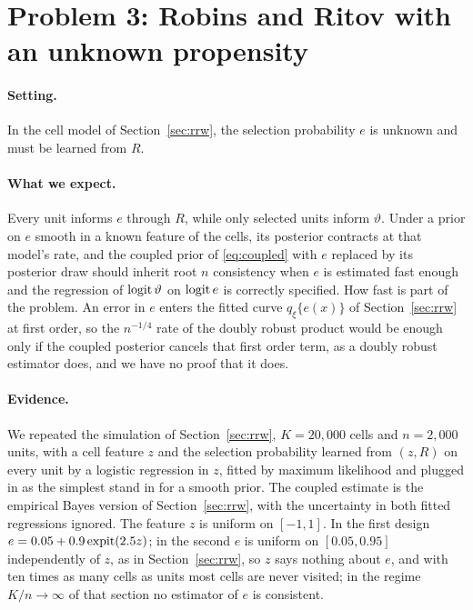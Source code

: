 \section{Problem 3: Robins and Ritov with an unknown propensity}

\paragraph{Setting.} In the cell model of Section~\ref{sec:rrw}, the selection probability $e$ is unknown and must be learned from $R$.

\paragraph{What we expect.} Every unit informs $e$ through $R$, while only selected units inform $\vartheta$. Under a prior on $e$ smooth in a known feature of the cells, its posterior contracts at that model's rate, and the coupled prior of \eqref{eq:coupled} with $e$ replaced by its posterior draw should inherit root $n$ consistency when $e$ is estimated fast enough and the regression of $\operatorname{logit}\vartheta$ on $\operatorname{logit} e$ is correctly specified. How fast is part of the problem. An error in $e$ enters the fitted curve $q_\xi\{e(x)\}$ of Section~\ref{sec:rrw} at first order, so the $n^{-1/4}$ rate of the doubly robust product would be enough only if the coupled posterior cancels that first order term, as a doubly robust estimator does, and we have no proof that it does.

\paragraph{Evidence.} We repeated the simulation of Section~\ref{sec:rrw}, $K = 20{,}000$ cells and $n = 2{,}000$ units, with a cell feature $z$ and the selection probability learned from $(z, R)$ on every unit by a logistic regression in $z$, fitted by maximum likelihood and plugged in as the simplest stand in for a smooth prior. The coupled estimate is the empirical Bayes version of Section~\ref{sec:rrw}, with the uncertainty in both fitted regressions ignored. The feature $z$ is uniform on $[-1, 1]$. In the first design $e = 0.05 + 0.9\operatorname{expit}(2.5z)$; in the second $e$ is uniform on $[0.05, 0.95]$ independently of $z$, as in Section~\ref{sec:rrw}, so $z$ says nothing about $e$, and with ten times as many cells as units most cells are never visited; in the regime $K/n \to \infty$ of that section no estimator of $e$ is consistent.

